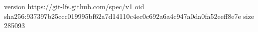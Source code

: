 version https://git-lfs.github.com/spec/v1
oid sha256:937397b25ccc019995bf62a7d14110c4ec0c692a6a4c947a0da0fa52eeff8e7e
size 285093
